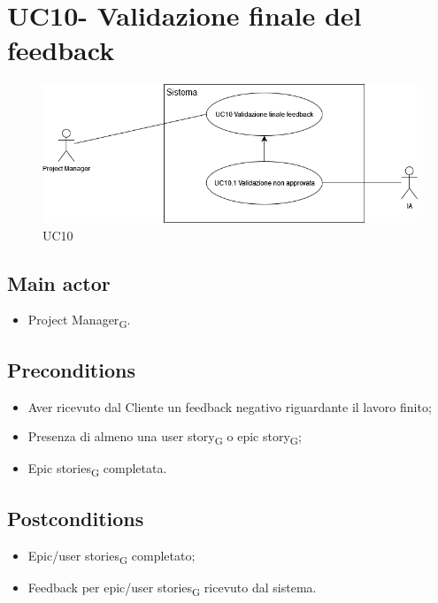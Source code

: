 \documentclass{article}
\begin{document}
        
\section{UC10- Validazione finale del feedback}

\begin{figure}[h]
      \centering
      \includegraphics[width=.8\textwidth, height=.6\textheight, keepaspectratio]{documenti/imgUML/UC10-VALIDAZIONE-FINALE-FEEDBACK.drawio.png}
        \caption{UC10}
      \label{fig:UC10}
    \end{figure}
    
    \subsection*{Main actor}
    \begin{itemize}
        \item Project Manager\textsubscript{G}.
    \end{itemize}
    
    \subsection*{Preconditions}
    \begin{itemize}
        \item Aver ricevuto dal Cliente un feedback negativo riguardante il lavoro finito;
        \item Presenza di almeno una user story\textsubscript{G}  o epic story\textsubscript{G};
        \item Epic stories\textsubscript{G}  completata.
    \end{itemize}
    
    \subsection*{Postconditions}
    \begin{itemize}
        \item Epic/user stories\textsubscript{G}  completato;
        \item Feedback per epic/user stories\textsubscript{G}  ricevuto dal sistema.
    \end{itemize}
    
\end{document}
